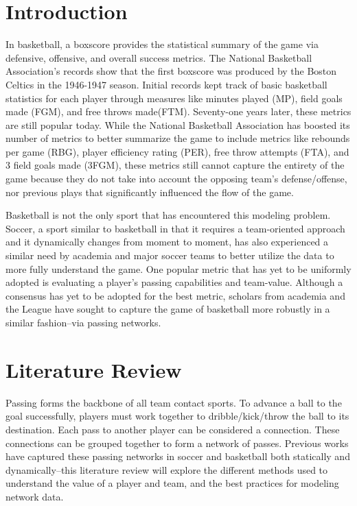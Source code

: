 \documentclass[12pt,twoside]{dukestatscithesis}
\theoremstyle{definition}
\theoremstyle{definition}
\theoremstyle{definition}
\theoremstyle{remark}
\begin{document}
\chapter{Introduction}\label{introduction}

In basketball, a boxscore provides the statistical summary of the game
via defensive, offensive, and overall success metrics. The National
Basketball Association's records show that the first boxscore was
produced by the Boston Celtics in the 1946-1947 season. Initial records
kept track of basic basketball statistics for each player through
measures like minutes played (MP), field goals made (FGM), and free
throws made(FTM). Seventy-one years later, these metrics are still
popular today. While the National Basketball Association has boosted its
number of metrics to better summarize the game to include metrics like
rebounds per game (RBG), player efficiency rating (PER), free throw
attempts (FTA), and 3 field goals made (3FGM), these metrics still
cannot capture the entirety of the game because they do not take into
account the opposing team's defense/offense, nor previous plays that
significantly influenced the flow of the game.

Basketball is not the only sport that has encountered this modeling
problem. Soccer, a sport similar to basketball in that it requires a
team-oriented approach and it dynamically changes from moment to moment,
has also experienced a similar need by academia and major soccer teams
to better utilize the data to more fully understand the game. One
popular metric that has yet to be uniformly adopted is evaluating a
player's passing capabilities and team-value. Although a consensus has
yet to be adopted for the best metric, scholars from academia and the
League have sought to capture the game of basketball more robustly in a
similar fashion--via passing networks.

\chapter{Literature Review}\label{rmd-basics}

Passing forms the backbone of all team contact sports. To advance a ball
to the goal successfully, players must work together to
dribble/kick/throw the ball to its destination. Each pass to another
player can be considered a connection. These connections can be grouped
together to form a network of passes. Previous works have captured these
passing networks in soccer and basketball both statically and
dynamically--this literature review will explore the different methods
used to understand the value of a player and team, and the best
practices for modeling network data.
\end{document}
